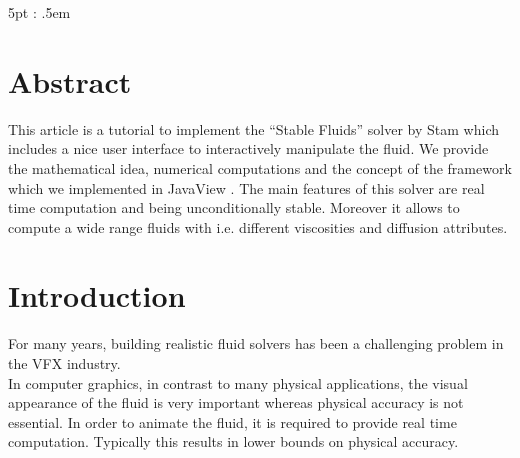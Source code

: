 \documentclass[a4paper,10pt,oneside,final,german,openbib,pdftex,titlepage]{scrbook}
\begin{document}
\mainmatter
\sloppy

    {\topsep}             %
    {5pt}             %
    {\itshape}         %
    {\parindent}       %
    {\bfseries}        %
    {:}                %
    {.5em}             %
    {}                 %

\theoremstyle{test333}
\newtheorem{test333}{TEST}
\newtheorem{thm}{Theorem}


\theoremstyle{theorem}%
\newtheorem{Lem}[thm]{Lemma}
\newtheorem{Cor}[thm]{Corollary}
\newtheorem{Def}[thm]{Definition}

\theoremstyle{definition}
\newtheorem{Rem}[thm]{Remark}



\makeatletter
\g@addto@macro{\thm@space@setup}{\thm@headpunct{:}}
\makeatother

\setcounter{chapter}{-1}
\chapter{Abstract}
This article is a tutorial to implement the ``Stable Fluids'' solver by Stam \cite{Stam} which includes a nice user interface to interactively manipulate the fluid. We provide the mathematical idea, numerical computations and the concept of the framework which we implemented in JavaView \cite{JavaView}. The main features of this solver are real time computation and being unconditionally stable. Moreover it allows to compute a wide range fluids with i.e. different viscosities and diffusion attributes.
\chapter{Introduction}

For many years, building realistic fluid solvers has been a challenging problem in the VFX industry.\\
In computer graphics, in contrast to many physical applications, the visual appearance of the fluid is very important whereas physical accuracy is not essential. In order to animate the fluid, it is required to provide real time computation. Typically this results in lower bounds on physical accuracy.\\
\end{document}
